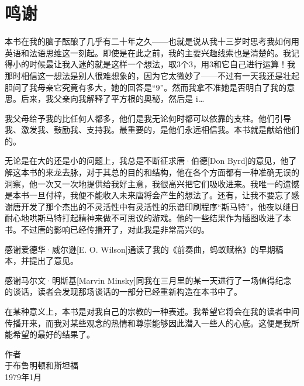 
\chapter{鸣谢}

本书在我的脑子酝酿了几乎有二十年之久——也就是说从我十三岁时思考我如何用英语和法语思维这一刻起。即使是在此之前，我的主要兴趣线索也是清楚的。我记得小的时候最让我入迷的就是这样一个想法，取$3$个$3$，用$3$和它自己进行运算！我那时相信这一想法是别人很难想象的，因为它太微妙了——不过有一天我还是壮起胆问了我母亲它究竟有多大，她的回答是“$9$”。然而我拿不准她是否明白了我的意思。后来，我父亲向我解释了平方根的奥秘，然后是 $\mathrm { i }$\ldots

我父母给予我的比任何人都多，他们是我无论何时都可以依靠的支柱。他们引导我、激发我、鼓励我、支持我。最重要的，是他们永远相信我。本书就是献给他们的。

无论是在大的还是小的问题上，我总是不断征求唐·伯德[Don Byrd]的意见，他了解这本书的来龙去脉，对于其总的目的和结构，他在各个方面都有一种准确无误的洞察，他一次又一次地提供给我好主意，我很高兴把它们吸收进来。我唯一的遗憾是本书一旦付梓，我便不能收入未来唐将会产生的想法了。还有，让我不要忘了感谢唐开发了那个杰出的不灵活性中有灵活性的乐谱印刷程序“斯马特”，他夜以继日耐心地哄斯马特打起精神来做不可思议的游戏。他的一些结果作为插图收进了本书。不过唐的影响已经传播开了，对此我是非常高兴的。

感谢爱德华·威尔逊[E. O. Wilson]通读了我的《前奏曲，蚂蚁赋格》的早期稿本，并提出了意见。

感谢马尔文·明斯基[Marvin Minsky]同我在三月里的某一天进行了一场值得纪念的谈话，读者会发现那场谈话的一部分已经重新构造在本书中了。

在某种意义上，本书是对我自己的宗教的一种表述。我希望它将会在我的读者中间传播开来，而我对某些观念的热情和尊崇能够因此潜入一些人的心底。这便是我所能希望的最好的结果了。

\begin{signature}
作者\\
于布鲁明顿和斯坦福\\
\small 1979年1月\\
\end{signature}
